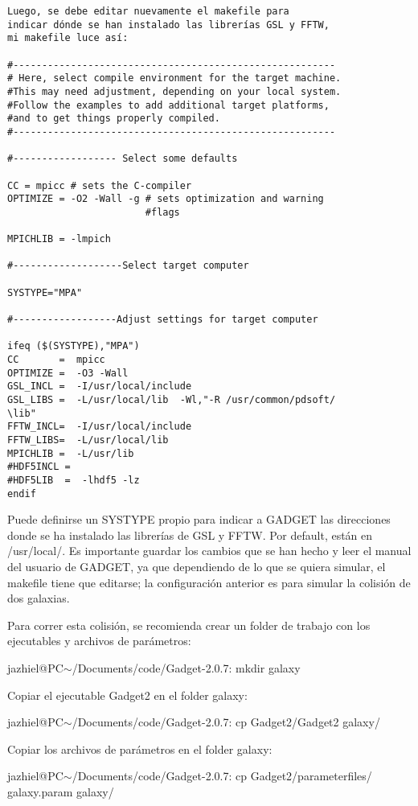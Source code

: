 \documentclass[a4paper,openright,12pt]{book}
\begin{document}
\begin{enumerate}
\begin{verbatim}
Luego, se debe editar nuevamente el makefile para 
indicar dónde se han instalado las librerías GSL y FFTW,
mi makefile luce así:

#--------------------------------------------------------
# Here, select compile environment for the target machine. 
#This may need adjustment, depending on your local system. 
#Follow the examples to add additional target platforms, 
#and to get things properly compiled.
#--------------------------------------------------------

#------------------ Select some defaults

CC = mpicc # sets the C-compiler
OPTIMIZE = -O2 -Wall -g # sets optimization and warning 
                        #flags

MPICHLIB = -lmpich

#-------------------Select target computer

SYSTYPE="MPA"

#------------------Adjust settings for target computer

ifeq ($(SYSTYPE),"MPA")
CC       =  mpicc   
OPTIMIZE =  -O3 -Wall
GSL_INCL =  -I/usr/local/include
GSL_LIBS =  -L/usr/local/lib  -Wl,"-R /usr/common/pdsoft/
\lib"
FFTW_INCL=  -I/usr/local/include
FFTW_LIBS=  -L/usr/local/lib
MPICHLIB =  -L/usr/lib
#HDF5INCL =  
#HDF5LIB  =  -lhdf5 -lz 
endif
\end{verbatim}
Puede definirse un \textsf{SYSTYPE} propio para indicar a GADGET las direcciones donde se ha instalado las librerías de GSL y FFTW. Por default, están en \textsf{/usr/local/}. Es importante guardar los cambios que se han hecho y leer el manual del usuario de GADGET, ya que dependiendo de lo que se quiera simular, el \textsf{makefile} tiene que editarse; la configuración anterior es para simular la colisión de dos galaxias.

Para correr esta colisión, se recomienda crear un folder de trabajo con los ejecutables y archivos de parámetros:

\textsf{jazhiel@PC$\sim$/Documents/code/Gadget-2.0.7: mkdir galaxy}

Copiar el ejecutable \textsf{Gadget2} en el folder \textsf{galaxy}:

\textsf{jazhiel@PC$\sim$/Documents/code/Gadget-2.0.7: cp Gadget2/Gadget2 galaxy/}

Copiar los archivos de parámetros en el folder \textsf{galaxy}:

\textsf{jazhiel@PC$\sim$/Documents/code/Gadget-2.0.7: cp Gadget2/parameterfiles/
galaxy.param galaxy/}


\end{enumerate}
\end{document}
